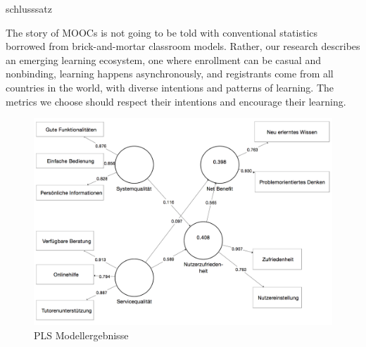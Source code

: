 schlusssatz

 

The story of MOOCs is not going to be told with conventional statistics borrowed from brick-and-mortar classroom models. Rather, our research describes an emerging learning ecosystem, one where enrollment can be casual and nonbinding, learning happens asynchronously, and registrants come from all countries in the world, with diverse intentions and patterns of learning. The metrics we choose should respect their intentions and encourage their learning.\parencite{reich2014tricky}


\begin{figure}[h]
\centering
\includegraphics[width=1\textwidth]{Grafiken/pls_bw_3.png}
\caption{PLS Modellergebnisse}
\label{PLS Modellergebnisse}
\end{figure}